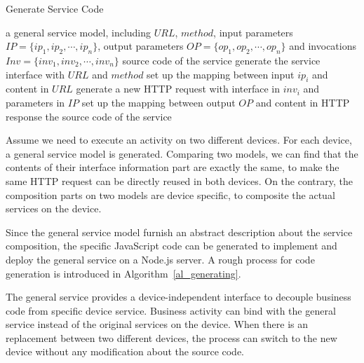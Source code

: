  \begin{algorithm}
        \caption{Generate Service Code}
        \begin{algorithmic}[1] 
            \Require a general service model, including $URL$, $method$, input parameters $IP = \{ ip_1, ip_2,\cdots,ip_n\}$, output parameters $OP = \{ op_1, op_2,\cdots,op_n\}$ and invocations $Inv = \{ inv_1, inv_2,\cdots,inv_n\}$
            \Ensure source code of the service
            \State generate the service interface with $URL$ and $method$
            		\State set up the mapping between input $ip_i$ and content in $URL$
            \EndFor
            		\State generate a new HTTP request with interface in $inv_i$ and parameters in $IP$
            		\State set up the mapping between output $OP$ and content in HTTP response
            \EndFor
            \Return the source code of the service
        \end{algorithmic}
        \label{al_generating}
 \end{algorithm}
 
Assume we need to execute an activity on two different devices. For each device, a general service model is generated. Comparing two models, we can find that the contents of their interface information part are exactly the same, to make the same HTTP request can be directly reused in both devices. On the contrary, the composition parts on two models are device specific, to composite the actual services on the device. 

Since the general service model furnish an abstract description about the service composition, the specific JavaScript code can be generated to implement and deploy the general service on a Node.js server\cite{wotframework}. A rough process for code generation is introduced in Algorithm~\ref{al_generating}. 

The general service provides a device-independent interface to decouple business code from specific device service. Business activity can bind with the general service instead of the original services on the device. When there is an replacement between two different devices, the process can switch to the new device without any modification about the source code. 



